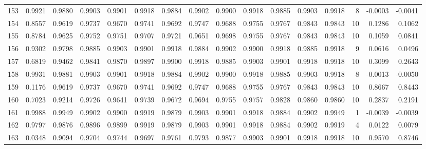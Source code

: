 \begin{tabular}{lrrrrrrrrrrrrrrr}
153 &      0.9921 &  0.9880 &  0.9903 &  0.9901 &  0.9918 &  0.9884 &  0.9902 &  0.9900 &  0.9918 &  0.9885 &   0.9903 &     0.9918 &      8 &                   -0.0003 &                    -0.0041 \\
154 &      0.8557 &  0.9619 &  0.9737 &  0.9670 &  0.9741 &  0.9692 &  0.9747 &  0.9688 &  0.9755 &  0.9767 &   0.9843 &     0.9843 &     10 &                    0.1286 &                     0.1062 \\
155 &      0.8784 &  0.9625 &  0.9752 &  0.9751 &  0.9707 &  0.9721 &  0.9651 &  0.9698 &  0.9755 &  0.9767 &   0.9843 &     0.9843 &     10 &                    0.1059 &                     0.0841 \\
156 &      0.9302 &  0.9798 &  0.9885 &  0.9903 &  0.9901 &  0.9918 &  0.9884 &  0.9902 &  0.9900 &  0.9918 &   0.9885 &     0.9918 &      9 &                    0.0616 &                     0.0496 \\
157 &      0.6819 &  0.9462 &  0.9841 &  0.9870 &  0.9897 &  0.9900 &  0.9918 &  0.9885 &  0.9903 &  0.9901 &   0.9918 &     0.9918 &     10 &                    0.3099 &                     0.2643 \\
158 &      0.9931 &  0.9881 &  0.9903 &  0.9901 &  0.9918 &  0.9884 &  0.9902 &  0.9900 &  0.9918 &  0.9885 &   0.9903 &     0.9918 &      8 &                   -0.0013 &                    -0.0050 \\
159 &      0.1176 &  0.9619 &  0.9737 &  0.9670 &  0.9741 &  0.9692 &  0.9747 &  0.9688 &  0.9755 &  0.9767 &   0.9843 &     0.9843 &     10 &                    0.8667 &                     0.8443 \\
160 &      0.7023 &  0.9214 &  0.9726 &  0.9641 &  0.9739 &  0.9672 &  0.9694 &  0.9755 &  0.9757 &  0.9828 &   0.9860 &     0.9860 &     10 &                    0.2837 &                     0.2191 \\
161 &      0.9988 &  0.9949 &  0.9902 &  0.9900 &  0.9919 &  0.9879 &  0.9903 &  0.9901 &  0.9918 &  0.9884 &   0.9902 &     0.9949 &      1 &                   -0.0039 &                    -0.0039 \\
162 &      0.9797 &  0.9876 &  0.9896 &  0.9899 &  0.9919 &  0.9879 &  0.9903 &  0.9901 &  0.9918 &  0.9884 &   0.9902 &     0.9919 &      4 &                    0.0122 &                     0.0079 \\
163 &      0.0348 &  0.9094 &  0.9704 &  0.9744 &  0.9697 &  0.9761 &  0.9793 &  0.9877 &  0.9903 &  0.9901 &   0.9918 &     0.9918 &     10 &                    0.9570 &                     0.8746 \\

\end{tabular}
